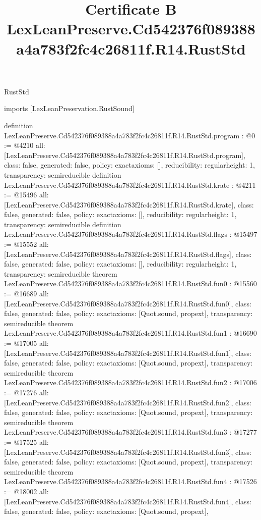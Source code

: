 \begin{lexlean}{RustStd}
\title{Certificate B LexLeanPreserve.Cd542376f089388a4a783f2fc4c26811f.R14.RustStd}
\begin{coremodule}
imports [LexLeanPreservation.RustSound]

definition LexLeanPreserve.Cd542376f089388a4a783f2fc4c26811f.R14.RustStd.program : @0 := @4210 {
  all: [LexLeanPreserve.Cd542376f089388a4a783f2fc4c26811f.R14.RustStd.program],
  class: false,
  generated: false,
  policy: exact{axioms: []},
  reducibility: regular{height: 1},
  transparency: semireducible
}
definition LexLeanPreserve.Cd542376f089388a4a783f2fc4c26811f.R14.RustStd.krate : @4211 := @15496 {
  all: [LexLeanPreserve.Cd542376f089388a4a783f2fc4c26811f.R14.RustStd.krate],
  class: false,
  generated: false,
  policy: exact{axioms: []},
  reducibility: regular{height: 1},
  transparency: semireducible
}
definition LexLeanPreserve.Cd542376f089388a4a783f2fc4c26811f.R14.RustStd.flags : @15497 := @15552 {
  all: [LexLeanPreserve.Cd542376f089388a4a783f2fc4c26811f.R14.RustStd.flags],
  class: false,
  generated: false,
  policy: exact{axioms: []},
  reducibility: regular{height: 1},
  transparency: semireducible
}
theorem LexLeanPreserve.Cd542376f089388a4a783f2fc4c26811f.R14.RustStd.fun0 : @15560 := @16689 {
  all: [LexLeanPreserve.Cd542376f089388a4a783f2fc4c26811f.R14.RustStd.fun0],
  class: false,
  generated: false,
  policy: exact{axioms: [Quot.sound, propext]},
  transparency: semireducible
}
theorem LexLeanPreserve.Cd542376f089388a4a783f2fc4c26811f.R14.RustStd.fun1 : @16690 := @17005 {
  all: [LexLeanPreserve.Cd542376f089388a4a783f2fc4c26811f.R14.RustStd.fun1],
  class: false,
  generated: false,
  policy: exact{axioms: [Quot.sound, propext]},
  transparency: semireducible
}
theorem LexLeanPreserve.Cd542376f089388a4a783f2fc4c26811f.R14.RustStd.fun2 : @17006 := @17276 {
  all: [LexLeanPreserve.Cd542376f089388a4a783f2fc4c26811f.R14.RustStd.fun2],
  class: false,
  generated: false,
  policy: exact{axioms: [Quot.sound, propext]},
  transparency: semireducible
}
theorem LexLeanPreserve.Cd542376f089388a4a783f2fc4c26811f.R14.RustStd.fun3 : @17277 := @17525 {
  all: [LexLeanPreserve.Cd542376f089388a4a783f2fc4c26811f.R14.RustStd.fun3],
  class: false,
  generated: false,
  policy: exact{axioms: [Quot.sound, propext]},
  transparency: semireducible
}
theorem LexLeanPreserve.Cd542376f089388a4a783f2fc4c26811f.R14.RustStd.fun4 : @17526 := @18002 {
  all: [LexLeanPreserve.Cd542376f089388a4a783f2fc4c26811f.R14.RustStd.fun4],
  class: false,
  generated: false,
  policy: exact{axioms: [Quot.sound, propext]},
}
\end{coremodule}
\end{lexlean}
